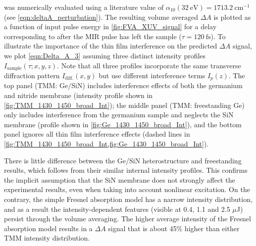  was numerically evaluated using a literature value of $\alpha_{10}(32 \ \textrm{eV}) = 1713.2 \ \textrm{cm}^{-1}$ (see \cref{eqn:deltaA_perturbation}). The resulting volume averaged $\Delta A$ is plotted as a function of input pulse energy in \cref{fig:FVA_XUV_signal} for a delay corresponding to after the MIR pulse has left the sample ($\tau = 120 \ \textrm{fs}$). To illustrate the importance of the thin film interference on the predicted $\Delta A$ signal, we plot \cref{eqn:Delta_A_3} assuming three distinct intensity profiles $I_{\textrm{sample}}(\tau; x, y, z)$. Note that all three profiles incorporate the same transverse diffraction pattern $I_{\textrm{diff.}}(x, y)$ but use different interference terms $I_p(z)$. The top panel (TMM: Ge/SiN) includes interference effects of both the germanium and nitride membrane (intensity profile shown in \cref{fig:TMM_1430_1450_broad_Int}); the middle panel (TMM: freestanding Ge) only includes interference from the germanium sample and neglects the SiN membrane (profile shown in \cref{fig:Ge_1430_1450_broad_Int}), and the bottom panel ignores all thin film interference effects (dashed lines in \cref{fig:TMM_1430_1450_broad_Int,fig:Ge_1430_1450_broad_Int}).

There is little difference between the Ge/SiN heterostructure and freestanding results, which follows from their similar internal intensity profiles. This confirms the implicit assumption that the SiN membrane does not strongly affect the experimental results, even when taking into account nonlinear excitation. On the contrary, the simple Fresnel absorption model has a narrow intensity distribution, and as a result the intensity-dependent features (visible at 0.4, 1.1 and 2.5 $\mu$J) persist through the volume averaging. The higher average intensity of the Fresnel absorption model results in a $\Delta A$ signal that is about 45\% higher than either TMM intensity distribution.

